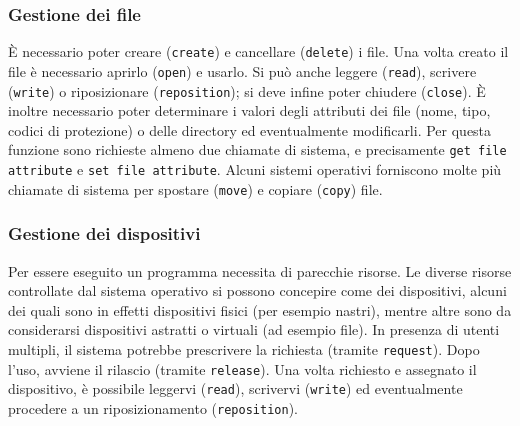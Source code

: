 \documentclass[11pt,a4paper]{article}
\begin{document}
\subsubsection{Gestione dei file}
È necessario poter creare (\texttt{create}) e cancellare (\texttt{delete}) i file.
Una vol­ta creato il file è necessario aprirlo (\texttt{open}) e usarlo. Si può anche leggere (\texttt{read}), scrivere
(\texttt{write}) o riposizionare (\texttt{reposition}); si deve infine poter chiudere (\texttt{close}).
È inoltre necessario poter determinare i valori
degli attributi dei file (nome, tipo, codici di protezione) o delle directory ed eventualmente modificarli.
Per questa funzione sono richieste almeno due chiamate di sistema, e precisamente \texttt{get file attribute} e \texttt{set file attribute}. Alcuni sistemi operativi forniscono molte più
chiamate di sistema per spostare (\texttt{move}) e copiare (\texttt{copy}) file.

\subsubsection{Gestione dei dispositivi}
Per essere eseguito un programma necessita di parecchie risorse.
Le diverse risorse controllate dal sistema operativo si possono concepire come dei di­spositivi, alcuni dei quali sono in effetti dispositivi fisici (per esempio nastri), mentre altre
sono da considerarsi dispositivi astratti o virtuali (ad esempio file). In presenza di utenti
multipli, il sistema potrebbe prescrivere la richiesta (tramite \texttt{request}).
Dopo l'uso, avviene il rilascio (tramite \texttt{release}).
Una volta richiesto e assegnato il dispositivo, è possibile leggervi (\texttt{read}), scrivervi
(\texttt{write}) ed eventualmente procedere a un riposizionamento (\texttt{reposition}).
\end{document}
